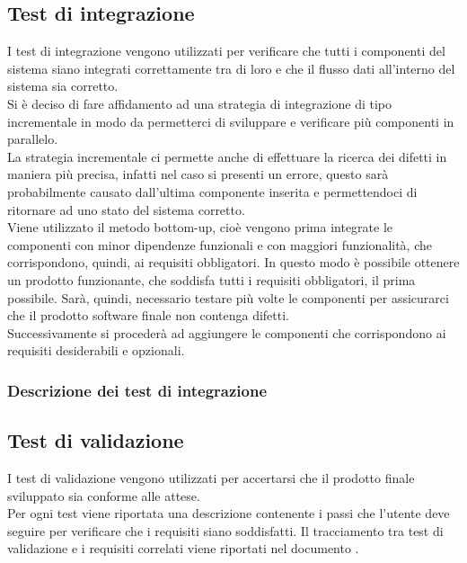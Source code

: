 	\subsection{Test di integrazione}
		I test di integrazione vengono utilizzati per verificare che tutti i componenti del sistema siano integrati correttamente tra di loro e che il flusso dati all'interno del sistema sia corretto.\\
		Si è deciso di fare affidamento ad una strategia di integrazione di tipo incrementale in modo da permetterci di sviluppare e verificare più componenti in parallelo.\\
		La strategia incrementale ci permette anche di effettuare la ricerca dei difetti in maniera più precisa, infatti nel caso si presenti un errore, questo sarà probabilmente causato dall'ultima componente inserita e permettendoci di ritornare ad uno stato del sistema corretto.\\
		Viene utilizzato il metodo bottom-up, cioè vengono prima integrate le componenti con minor dipendenze funzionali e con maggiori funzionalità, che corrispondono, quindi, ai requisiti obbligatori. In questo modo è possibile ottenere un prodotto funzionante, che soddisfa tutti i requisiti obbligatori, il prima possibile. Sarà, quindi, necessario testare più volte le componenti per assicurarci che il prodotto software finale non contenga difetti.\\ Successivamente si procederà ad aggiungere le componenti che corrispondono ai requisiti desiderabili e opzionali.
		 
		\subsubsection{Descrizione dei test di integrazione}
	
	\subsection{Test di validazione}
		I test di validazione vengono utilizzati per accertarsi che il prodotto finale sviluppato sia conforme alle attese.\\
		Per ogni test viene riportata una descrizione contenente i passi che l'utente deve seguire per verificare che i requisiti siano soddisfatti. Il tracciamento tra test di validazione e i requisiti correlati viene riportati nel documento \docNameVersionAdR.
		
